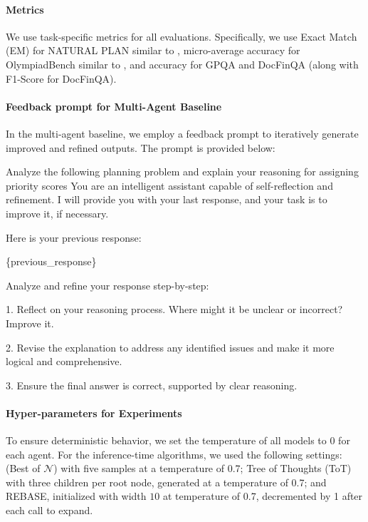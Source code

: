 \paragraph{Metrics}
We use task-specific metrics for all evaluations. Specifically, we use Exact Match (EM) for NATURAL PLAN similar to \citet{zheng2024natural}, micro-average accuracy for OlympiadBench similar to \citet{he-etal-2024-olympiadbench}, and accuracy for GPQA and DocFinQA (along with F1-Score for DocFinQA).

\paragraph{Feedback prompt for Multi-Agent Baseline} In the multi-agent baseline, we employ a feedback prompt to iteratively generate improved and refined outputs. The prompt is provided below:

\begin{tcolorbox}[boxrule=0pt, frame hidden, title=Feedback Prompt, breakable, sharp corners, borderline west={0pt}{0pt}{black!50}, title style={
        colback=black!50, %
        colframe=black!50, %
        coltitle=black %
    }]

Analyze the following planning problem and explain your reasoning for assigning priority scores You are an intelligent assistant capable of self-reflection and refinement. I will provide you with your last response, and your task is to improve it, if necessary.

Here is your previous response:

\{previous\_response\}

Analyze and refine your response step-by-step:

1. Reflect on your reasoning process. Where might it be unclear or incorrect? Improve it.

2. Revise the explanation to address any identified issues and make it more logical and comprehensive.

3. Ensure the final answer is correct, supported by clear reasoning.
\end{tcolorbox}

\paragraph{Hyper-parameters for Experiments}
To ensure deterministic behavior, we set the temperature of all models to 0 for each agent.  For the inference-time algorithms, we used the following settings: \plangen{} (Best of $\mathcal{N}$) with five samples at a temperature of 0.7; Tree of Thoughts (ToT) with three children per root node, generated at a temperature of 0.7; and REBASE, initialized with width $10$ at temperature of 0.7, decremented by 1 after each call to expand.

